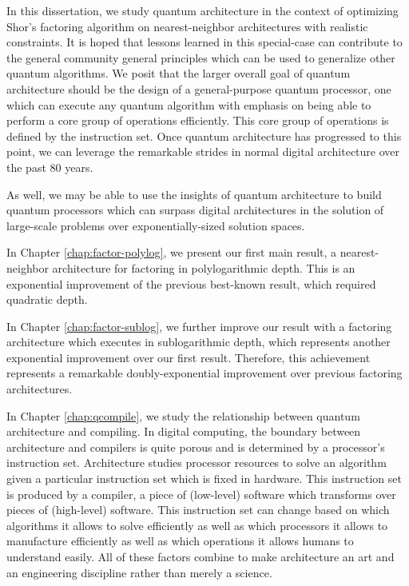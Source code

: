 In this dissertation, we study quantum architecture in the context of optimizing Shor's factoring algorithm on nearest-neighbor architectures with realistic constraints. It is hoped that lessons learned in this special-case can contribute to the general community general principles which can be used to generalize other quantum algorithms. We posit that the larger overall goal of quantum architecture should be the design of a general-purpose quantum processor, one which can execute any quantum algorithm with emphasis on being able to perform a core group of operations efficiently. This core group of operations is defined by the instruction set. Once quantum architecture has progressed to this point, we can leverage the remarkable strides in normal digital architecture over the past 80 years.

As well, we may be able to use the insights of quantum architecture to build quantum processors which can surpass digital architectures in the solution of large-scale problems over exponentially-sized solution spaces.

In Chapter \ref{chap:factor-polylog}, we present our first main result, a
nearest-neighbor architecture for factoring in polylogarithmic depth. This is an exponential improvement of the previous best-known result, which required quadratic depth.

In Chapter \ref{chap:factor-sublog}, we further improve our result with a
factoring architecture which executes in sublogarithmic depth, which represents another exponential improvement over our first result. Therefore, this achievement represents a remarkable doubly-exponential improvement over previous factoring architectures.

In Chapter \ref{chap:qcompile}, we study the relationship between quantum architecture and compiling. In digital computing, the boundary between architecture and compilers is quite porous and is determined by a processor's instruction set. Architecture studies processor resources to solve an algorithm given a particular instruction set which is fixed in hardware. This instruction set is produced by a compiler, a piece of (low-level) software which transforms over pieces of (high-level) software. This instruction set can change based on which algorithms it allows to solve efficiently as well as which processors it allows to manufacture efficiently as well as which operations it allows humans to understand easily. All of these factors combine to make architecture an art and an engineering discipline rather than merely a science.

